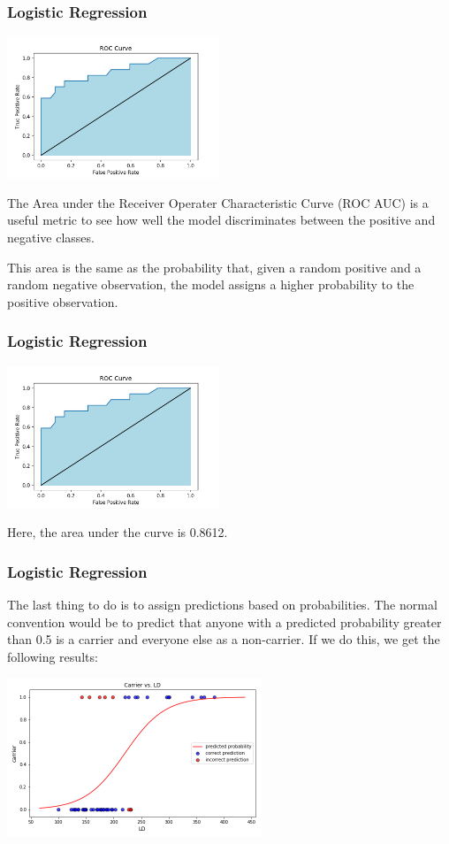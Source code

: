\documentclass[11pt, table]{beamer}
\begin{document}
\begin{frame}
\frametitle{Logistic Regression}
\begin{center}
	\includegraphics[width = 2.5in]{images/Dystrophy/roc_02.png}
\end{center}

The Area under the Receiver Operater Characteristic Curve (ROC AUC) is a useful metric to see how well the model discriminates between the positive and negative classes.
\vspace{0.1in}

This area is the same as the probability that, given a random positive and a random negative observation, the model assigns a higher probability to the positive observation. 
\end{frame}

\begin{frame}
\frametitle{Logistic Regression}
\begin{center}
	\includegraphics[width = 2.5in]{images/Dystrophy/roc_02.png}
\end{center}

Here, the area under the curve is 0.8612.

\end{frame}

\begin{frame}
\frametitle{Logistic Regression}
The last thing to do is to assign predictions based on probabilities. The normal convention would be to predict that anyone with a predicted probability greater than 0.5 is a carrier and everyone else as a non-carrier. If we do this, we get the following results:

\begin{center}
	\includegraphics[width = 3in]{images/Dystrophy/scatter_04.png}
\end{center}

\end{frame}
\end{document}
